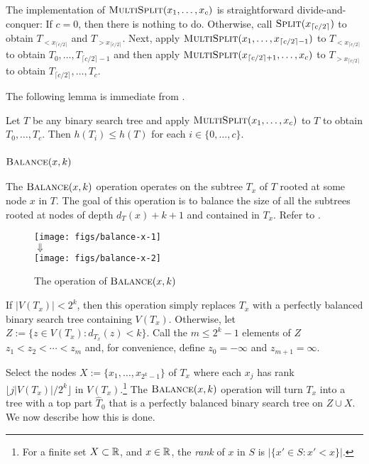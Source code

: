 \documentclass[10pt, conference, compsocconf]{IEEEtran}
\let\le\leqslant
\begin{document}
The implementation of $\textsc{MultiSplit}(x_1,\dots,x_c)$ is straightforward divide-and-conquer:  If $c=0$, then there is nothing to do.  Otherwise, call $\textsc{Split}(x_{\lceil c/2\rceil})$ to obtain $T_{<x_{\lceil c/2\rceil}}$ and $T_{>x_{\lceil c/2\rceil}}$.  Next, apply $\textsc{MultiSplit}(x_1,\dots,x_{\lceil c/2\rceil-1})$ to $T_{<x_{\lceil c/2\rceil}}$ to obtain $T_0,\dots,T_{\lceil c/2\rceil-1}$ and then apply $\textsc{MultiSplit}(x_{\lceil c/2\rceil+1},\dots,x_c)$ to $T_{>x_{\lceil c/2\rceil}}$ to obtain $T_{\lceil c/2\rceil},\dots,T_c$.

The following lemma is immediate from .
\begin{lem}
  Let $T$ be any binary search tree and apply $\textsc{MultiSplit}(x_1,\dots,x_c)$ to $T$ to obtain $T_0,\dots,T_c$.  Then $h(T_i)\le h(T)$ for each $i\in\{0,\dots,c\}$.
\end{lem}

\subsubsection{$\textsc{Balance}(x,k)$}

The $\textsc{Balance}(x,k)$ operation operates on the subtree $T_x$ of $T$ rooted at some node $x$ in $T$.
The goal of this operation is to balance the size of all the subtrees rooted at nodes of depth $d_T(x)+k+1$ and contained in $T_x$.
Refer to .

\begin{figure}
    \begin{center}
      \texttt{[image: figs/balance-x-1]} \\[-2ex]
      $\Downarrow$ \\[1ex]
      \texttt{[image: figs/balance-x-2]}
    \end{center}
  \caption{The operation of $\textsc{Balance}(x,k)$}
\end{figure}

If $|V(T_x)|< 2^k$, then this operation simply replaces $T_x$ with a perfectly balanced binary search tree containing $V(T_x)$.  Otherwise, let $Z:=\{z\in V(T_x): d_{T_x}(z)< k\}$.  Call the $m\le 2^k-1$ elements of $Z$  $z_1<z_2<\cdots<z_{m}$ and, for convenience, define $z_0=-\infty$ and $z_{m+1}=\infty$.

Select the nodes $X:=\{x_1,\dots,x_{2^k-1}\}$ of $T_x$ where each $x_j$ has rank $\lfloor j|V(T_x)|/2^k\rfloor$ in $V(T_x)$.\footnote{For a finite set $X\subset\mathbb{R}$, and $x\in\mathbb{R}$, the \emph{rank} of $x$ in $S$ is $|\{x'\in S: x'<x\}|$.}  The $\textsc{Balance}(x,k)$ operation will turn $T_x$ into a tree with a top part $\hat{T}_0$ that is a perfectly balanced binary search tree on $Z\cup X$.  We now describe how this is done.
\end{document}
